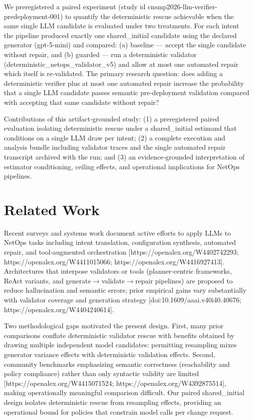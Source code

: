 \documentclass[conference]{IEEEtran}
\begin{document}
We preregistered a paired experiment (study id cnsmp2026-llm-verifier-predeployment-001) to quantify the deterministic rescue achievable when the same single LLM candidate is evaluated under two treatments. For each intent the pipeline produced exactly one shared\_initial candidate using the declared generator (gpt-5-mini) and compared: (a) baseline --- accept the single candidate without repair, and (b) guarded --- run a deterministic validator (deterministic\_netops\_validator\_v5) and allow at most one automated repair which itself is re‑validated. The primary research question: does adding a deterministic verifier plus at most one automated repair increase the probability that a single LLM candidate passes semantic pre‑deployment validation compared with accepting that same candidate without repair?

Contributions of this artifact‑grounded study: (1) a preregistered paired evaluation isolating deterministic rescue under a shared\_initial estimand that conditions on a single LLM draw per intent; (2) a complete execution and analysis bundle including validator traces and the single automated repair transcript archived with the run; and (3) an evidence‑grounded interpretation of estimator conditioning, ceiling effects, and operational implications for NetOps pipelines.

\section{Related Work}
Recent surveys and systems work document active efforts to apply LLMs to NetOps tasks including intent translation, configuration synthesis, automated repair, and tool‑augmented orchestration [https://openalex.org/W4402742293; https://openalex.org/W4411015066; https://openalex.org/W4416927413]. Architectures that interpose validators or tools (planner‑centric frameworks, ReAct variants, and generate\ensuremath{\rightarrow}validate\ensuremath{\rightarrow}repair pipelines) are proposed to reduce hallucination and semantic errors; prior empirical gains vary substantially with validator coverage and generation strategy [doi:10.1609/aaai.v40i40.40676; https://openalex.org/W4404240614].

Two methodological gaps motivated the present design. First, many prior comparisons conflate deterministic validator rescue with benefits obtained by drawing multiple independent model candidates: permitting resampling mixes generator variance effects with deterministic validation effects. Second, community benchmarks emphasizing semantic correctness (reachability and policy compliance) rather than only syntactic validity are limited [https://openalex.org/W4415071524; https://openalex.org/W4392875514], making operationally meaningful comparison difficult. Our paired shared\_initial design isolates deterministic rescue from resampling effects, providing an operational bound for policies that constrain model calls per change request.
\end{document}

